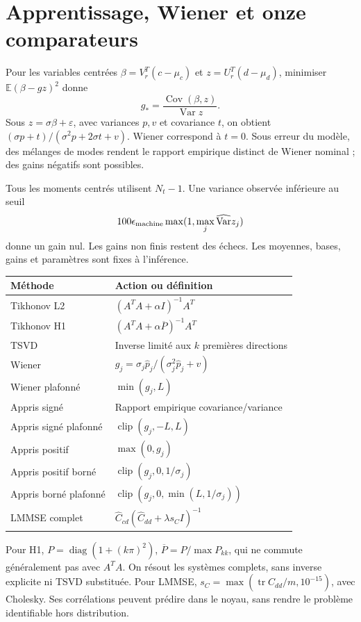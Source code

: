 \documentclass[11pt,a4paper]{article}
\begin{document}
\section{Apprentissage, Wiener et onze comparateurs}
Pour les variables centrées $\beta=V_r^T(c-\mu_c)$ et $z=U_r^T(d-\mu_d)$, minimiser $\mathbb E(\beta-gz)^2$ donne
\[
g_* =\frac{\operatorname{Cov}(\beta,z)}{\operatorname{Var}z}.
\]
Sous $z=\sigma\beta+\varepsilon$, avec variances $p,v$ et covariance $t$, on obtient $(\sigma p+t)/(\sigma^2p+2\sigma t+v)$. Wiener correspond à $t=0$. Sous erreur du modèle, des mélanges de modes rendent le rapport empirique distinct de Wiener nominal ; des gains négatifs sont possibles.

Tous les moments centrés utilisent $N_t-1$. Une variance observée inférieure au seuil
\[100\epsilon_{\rm machine}\max(1,\max_j\widehat{\operatorname{Var}}z_j)\]
donne un gain nul. Les gains non finis restent des échecs. Les moyennes, bases, gains et paramètres sont fixes à l'inférence.
\begin{center}\small\begin{tabular}{p{.33\linewidth}p{.53\linewidth}}\toprule
Méthode & Action ou définition\\\midrule
Tikhonov L2 & $(A^TA+\alpha I)^{-1}A^T$\\
Tikhonov H1 & $(A^TA+\alpha\overline P)^{-1}A^T$\\
TSVD & Inverse limité aux $k$ premières directions\\
Wiener & $g_j=\sigma_j\widehat p_j/(\sigma_j^2\widehat p_j+v)$\\
Wiener plafonné & $\min(g_j,L)$\\
Appris signé & Rapport empirique covariance/variance\\
Appris signé plafonné & $\operatorname{clip}(g_j,-L,L)$\\
Appris positif & $\max(0,g_j)$\\
Appris positif borné & $\operatorname{clip}(g_j,0,1/\sigma_j)$\\
Appris borné plafonné & $\operatorname{clip}(g_j,0,\min(L,1/\sigma_j))$\\
LMMSE complet & $\widehat C_{cd}(\widehat C_{dd}+\lambda s_CI)^{-1}$\\\bottomrule
\end{tabular}\end{center}
Pour H1, $P=\operatorname{diag}(1+(k\pi)^2)$, $\overline P=P/\max P_{kk}$, qui ne commute généralement pas avec $A^TA$. On résout les systèmes complets, sans inverse explicite ni TSVD substituée. Pour LMMSE, $s_C=\max(\operatorname{tr}\widehat C_{dd}/m,10^{-15})$, avec Cholesky. Ses corrélations peuvent prédire dans le noyau, sans rendre le problème identifiable hors distribution.
\end{document}
